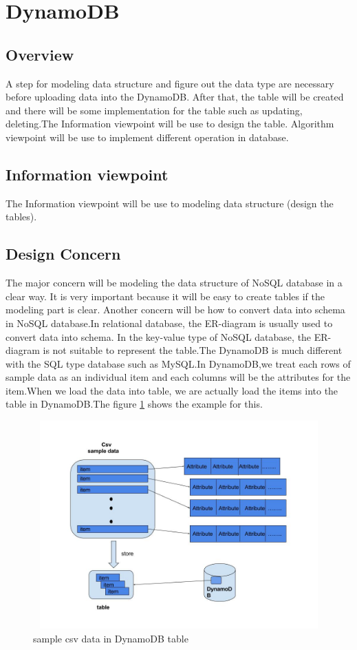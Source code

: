\section{DynamoDB}
    \subsection{Overview}
    A step for modeling data structure and figure out the data type are necessary before uploading data into the DynamoDB. After that, the table will be created and there will be some implementation for the table such as updating, deleting.The Information viewpoint will be use to design the table. Algorithm viewpoint will be use to implement different operation in database.    
    \subsection{Information viewpoint}
    The Information viewpoint will be use to modeling data structure (design the tables).
	\subsection{ Design Concern}
	The major concern will be modeling the data structure of NoSQL database in a clear way. It is very important because it will be easy to create tables if the modeling part is clear. Another concern will be how to convert data into schema in NoSQL database.In relational database, the ER-diagram is usually used to convert data into schema. In the key-value type of NoSQL database, the ER-diagram is not suitable to represent the table.The DynamoDB is much different with the SQL type database such as MySQL.In DynamoDB,we treat each rows of sample data as an individual item and each columns will be the attributes for the item.When we load the data into table, we are actually load the items into the table in DynamoDB.The figure \ref{fig:1} shows the example for this.
\begin{figure}[h]
 \includegraphics[width=15cm, height=8cm]{11.jpg}
 \centering
 \caption{\label{fig:1}sample csv data in DynamoDB table}
 \end{figure}

